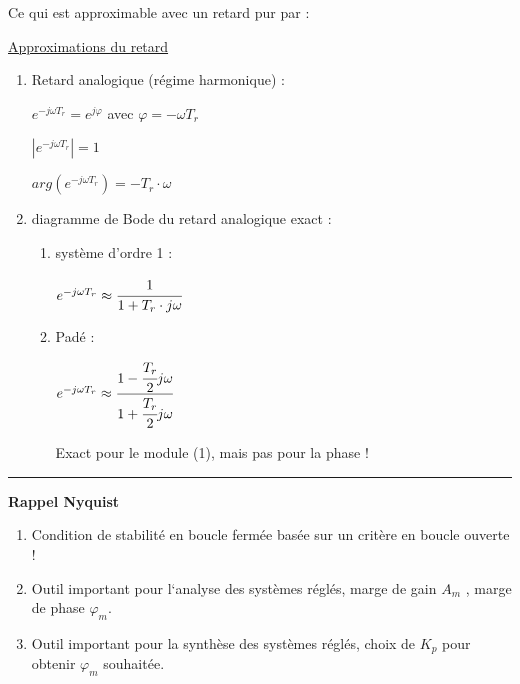 \documentclass[	DIV=calc,%
							paper=a4,%
							fontsize=11pt,%
							twocolumn]{scrartcl} %
\newcommand{\hformbar}[1]{\bigskip\hrule\vspace{5pt}} %
\newcounter{mycounter}
\newcommand{\formdesc}[1]{\noindent\textbf{#1} \addtocounter{mycounter}{1} \hfill \themycounter}
\begin{document}
\vspace{2mm}


\vspace{0.5cm}


\vspace{3mm}

Ce qui est approximable avec un retard pur par : 

\vspace{3mm}

\underline{Approximations du retard}

\begin{enumerate}
    \item Retard analogique (régime harmonique) :
    
        $e^{-j \omega T_r} = e^{j\varphi}$ avec $\varphi = - \omega T_r$

        $|e^{-j\omega T_r}| = 1$

        $arg(e^{-j\omega T_r}) = -T_r \cdot \omega$

    \item diagramme de Bode du retard analogique exact : 
        \begin{enumerate}
            \item système d'ordre 1 : 
            
                $e^{-j\omega T_r}  \approx \cfrac{1}{1+T_r\cdot j\omega}$

            \item Padé : 
                
                $e^{-j\omega T_r}  \approx \cfrac{1-\cfrac{T_r}{2}j\omega}{1+\cfrac{T_r}{2}j\omega}$

            Exact pour le module (1), mais pas pour la phase !

        \end{enumerate}
\end{enumerate}
\hformbar

\newpage

\formdesc{Rappel Nyquist}

\begin{enumerate}
    \item Condition de stabilité en boucle fermée basée sur un critère en boucle ouverte !
    \item Outil important pour l‘analyse des systèmes réglés, marge de gain $A_m$ , marge de phase $\varphi_m$.
    \item Outil important pour la synthèse des systèmes réglés, choix de $K_p$ pour obtenir $\varphi_m$ souhaitée.
\end{enumerate}
\end{document}
